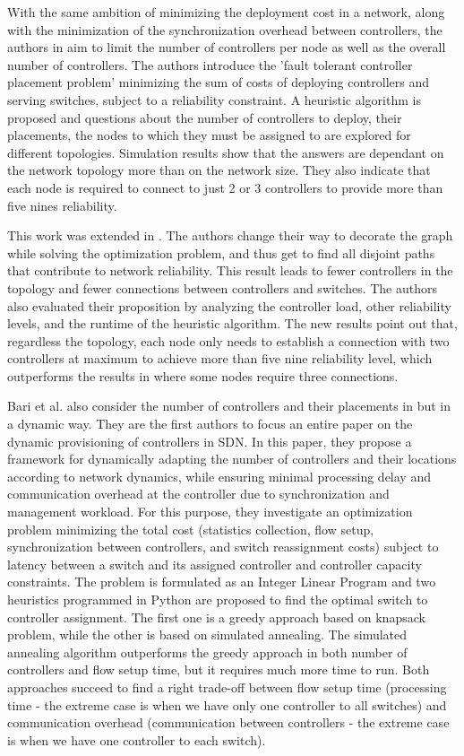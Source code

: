 \documentclass{IEEEtran}
\begin{document}
With the same ambition of minimizing the deployment cost in a network, along with the minimization of the synchronization overhead between controllers, the authors in \cite{RoRu14} aim to limit the number of controllers per node as well as the overall number of controllers. The authors introduce the 'fault tolerant controller placement problem' minimizing the sum of costs of deploying controllers and serving switches, subject to a reliability constraint. A heuristic algorithm is proposed and questions about the number of controllers to deploy, their placements, the nodes to which they must be assigned to are explored for different topologies. Simulation results show that the answers are dependant on the network topology more than on the network size. They also indicate that each node is required to connect to just 2 or 3 controllers to provide more than five nines reliability.

This work was extended in \cite{RoRu16}. The authors change their way to decorate the graph while solving the optimization problem, and thus get to find all disjoint paths that contribute to network reliability. This result leads to fewer controllers in the topology and fewer connections between controllers and switches. The authors also evaluated their proposition by analyzing the controller load, other reliability levels, and the runtime of the heuristic algorithm. The new results point out that, regardless the topology, each node only needs to establish a connection with two controllers at maximum to achieve more than five nine reliability level, which outperforms the results in \cite{RoRu14} where some nodes require three connections. 

Bari et al. also consider the number of controllers and their placements in \cite{BaRo13} but in a dynamic way. They are the first authors to focus an entire paper on the dynamic provisioning of controllers in SDN. In this paper, they propose a framework for dynamically adapting the number of controllers and their locations according to network dynamics, while ensuring minimal processing delay and communication overhead at the controller due to synchronization and management workload. For this purpose, they investigate an optimization problem minimizing the total cost (statistics collection, flow setup, synchronization between controllers, and switch reassignment costs) subject to latency between a switch and its assigned controller and controller capacity constraints. The problem is formulated as an Integer Linear Program and two heuristics programmed in Python are proposed to find the optimal switch to controller assignment. The first one is a greedy approach based on knapsack problem, while the other is based on simulated annealing. The simulated annealing algorithm outperforms the greedy approach in both number of controllers and flow setup time, but it requires much more time to run. Both approaches succeed to find a right trade-off between flow setup time (processing time - the extreme case is when we have only one controller to all switches) and communication overhead (communication between controllers - the extreme case is when we have one controller to each switch). 
\end{document}
